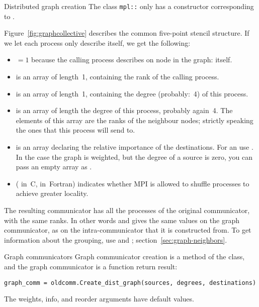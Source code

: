\begin{mplnote}{Distributed graph creation}
  The class \lstinline+mpl::+
  only has a constructor corresponding to .
\end{mplnote}

Figure~\ref{fig:graphcollective} describes the common five-point
stencil structure. If we let each process only describe itself, we get
the following:
\begin{itemize}
\item {}$=1$ because the calling process describes on node
  in the graph: itself.
\item {} is an array of length~1, containing the rank of the
  calling process.
\item {} is an array of length~1, containing the degree
  (probably:~4) of this process.
\item {} is an array of length the degree of this
  process, probably again~4. The elements of this array are the ranks
  of the neighbour nodes; strictly speaking the ones that this process
  will send to.
\item {} is an array declaring the relative importance of the
  destinations. For an  use
  .
  In the case the graph is weighted, but the degree of a source is zero, you can pass
  an empty array as .
\item {} ( in~C,  in~Fortran) indicates
  whether MPI is allowed to shuffle processes to achieve greater locality.
\end{itemize}

The resulting communicator has all the processes of the original
communicator, with the same ranks.
In other words  and 
gives the same values on the graph communicator, as on the intra-communicator
that it is constructed from.
To get information about the grouping,
use 
and ;
section~\ref{sec:graph-neighbors}.

\begin{pythonnote}{Graph communicators}
  Graph communicator creation is a method of the  class,
  and the graph communicator is a function return result:
\begin{lstlisting}
graph_comm = oldcomm.Create_dist_graph(sources, degrees, destinations)
\end{lstlisting}
  The weights, info, and reorder arguments have default values.
\end{pythonnote}

